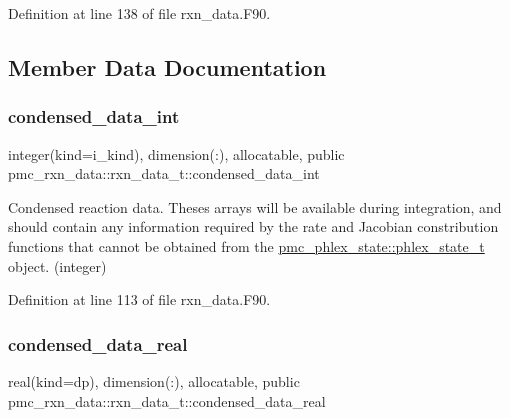 Definition at line 138 of file rxn\+\_\+data.\+F90.



\subsection{Member Data Documentation}
\mbox{\label{structpmc__rxn__data_1_1rxn__data__t_a2109ea36cdccb917c9c4a0eb2e25ce16}} 
\subsubsection{\texorpdfstring{condensed\+\_\+data\+\_\+int}{condensed\_data\_int}}
{\footnotesize\ttfamily integer(kind=i\+\_\+kind), dimension(\+:), allocatable, public pmc\+\_\+rxn\+\_\+data\+::rxn\+\_\+data\+\_\+t\+::condensed\+\_\+data\+\_\+int}



Condensed reaction data. Theses arrays will be available during integration, and should contain any information required by the rate and Jacobian constribution functions that cannot be obtained from the {\ttfamily \mbox{\hyperlink{structpmc__phlex__state_1_1phlex__state__t}{pmc\+\_\+phlex\+\_\+state\+::phlex\+\_\+state\+\_\+t}}} object. (integer) 



Definition at line 113 of file rxn\+\_\+data.\+F90.

\mbox{\label{structpmc__rxn__data_1_1rxn__data__t_a7aae601ae4392a93f4585e660c2c7d29}} 
\subsubsection{\texorpdfstring{condensed\+\_\+data\+\_\+real}{condensed\_data\_real}}
{\footnotesize\ttfamily real(kind=dp), dimension(\+:), allocatable, public pmc\+\_\+rxn\+\_\+data\+::rxn\+\_\+data\+\_\+t\+::condensed\+\_\+data\+\_\+real}



